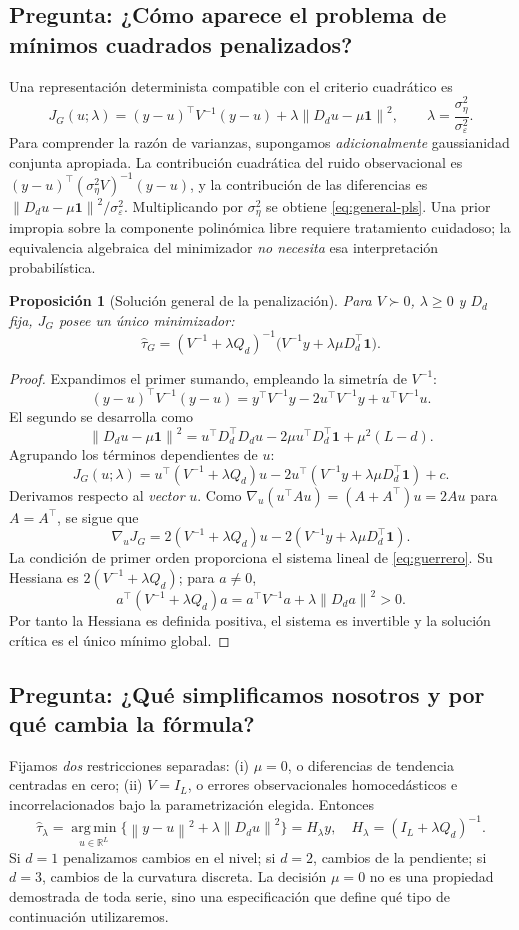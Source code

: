 \documentclass[11pt,letterpaper,parskip=half,headings=small]{scrartcl}
\newtheorem{proposicion}{Proposición}[section]
\theoremstyle{definition}\newtheorem{definicion}[proposicion]{Definición}
\theoremstyle{remark}\newtheorem{observacion}[proposicion]{Observación}
\newcommand{\R}{\mathbb R}\newcommand{\EE}{\mathbb E}\newcommand{\Var}{\operatorname{Var}}
\newcommand{\argmin}{\operatorname*{arg\,min}}\newcommand{\diag}{\operatorname{diag}}
\newcommand{\norm}[1]{\left\lVert#1\right\rVert}\newcommand{\inner}[2]{\left\langle#1,#2\right\rangle}
\newcommand{\pregunta}[1]{\subsection{Pregunta: #1}}
\begin{document}
\pregunta{¿Cómo aparece el problema de mínimos cuadrados penalizados?}
Una representación determinista compatible con el criterio cuadrático es
\begin{equation}\label{eq:general-pls}
J_G(u;\lambda)=(y-u)^\top V^{-1}(y-u)+\lambda\norm{D_du-\mu\bm1}^2,
\qquad\lambda=\frac{\sigma_\eta^2}{\sigma_\varepsilon^2}.
\end{equation}
Para comprender la razón de varianzas, supongamos \emph{adicionalmente} gaussianidad conjunta apropiada. La contribución cuadrática del ruido observacional es $(y-u)^\top(\sigma_\eta^2V)^{-1}(y-u)$, y la contribución de las diferencias es $\norm{D_du-\mu\bm1}^2/\sigma_\varepsilon^2$. Multiplicando por $\sigma_\eta^2$ se obtiene \eqref{eq:general-pls}. Una prior impropia sobre la componente polinómica libre requiere tratamiento cuidadoso; la equivalencia algebraica del minimizador \emph{no necesita} esa interpretación probabilística.

\begin{proposicion}[Solución general de la penalización]\label{prop:general}
Para $V\succ0$, $\lambda\geq0$ y $D_d$ fija, $J_G$ posee un único minimizador:
\begin{equation}\boxed{\widehat\tau_G=(V^{-1}+\lambda Q_d)^{-1}
\bigl(V^{-1}y+\lambda\mu D_d^\top\bm1\bigr).}\label{eq:guerrero}
\end{equation}
\end{proposicion}
\begin{proof}
Expandimos el primer sumando, empleando la simetría de $V^{-1}$:
\[
(y-u)^\top V^{-1}(y-u)=y^\top V^{-1}y-2u^\top V^{-1}y+u^\top V^{-1}u.
\]
El segundo se desarrolla como
\[
\norm{D_du-\mu\bm1}^2=u^\top D_d^\top D_du-2\mu u^\top D_d^\top\bm1+\mu^2(L-d).
\]
Agrupando los términos dependientes de $u$:
\[
J_G(u;\lambda)=u^\top(V^{-1}+\lambda Q_d)u
-2u^\top(V^{-1}y+\lambda\mu D_d^\top\bm1)+c.
\]
Derivamos respecto al \emph{vector} $u$. Como $\nabla_u(u^\top Au)=(A+A^\top)u=2Au$ para $A=A^\top$, se sigue que
\[
\nabla_uJ_G=2(V^{-1}+\lambda Q_d)u
-2(V^{-1}y+\lambda\mu D_d^\top\bm1).
\]
La condición de primer orden proporciona el sistema lineal de \eqref{eq:guerrero}. Su Hessiana es $2(V^{-1}+\lambda Q_d)$; para $a\neq0$,
\[
a^\top(V^{-1}+\lambda Q_d)a
=a^\top V^{-1}a+\lambda\norm{D_da}^2>0.
\]
Por tanto la Hessiana es definida positiva, el sistema es invertible y la solución crítica es el único mínimo global.
\end{proof}

\pregunta{¿Qué simplificamos nosotros y por qué cambia la fórmula?}
Fijamos \emph{dos} restricciones separadas: (i) $\mu=0$, o diferencias de tendencia centradas en cero; (ii) $V=I_L$, o errores observacionales homocedásticos e incorrelacionados bajo la parametrización elegida. Entonces
\begin{equation}\label{eq:PLS}
\boxed{\widehat\tau_\lambda=\argmin_{u\in\R^L}
\{\norm{y-u}^2+\lambda\norm{D_du}^2\}=H_\lambda y,
\quad H_\lambda=(I_L+\lambda Q_d)^{-1}.}
\end{equation}
Si $d=1$ penalizamos cambios en el nivel; si $d=2$, cambios de la pendiente; si $d=3$, cambios de la curvatura discreta. La decisión $\mu=0$ no es una propiedad demostrada de toda serie, sino una especificación que define qué tipo de continuación utilizaremos.
\end{document}
